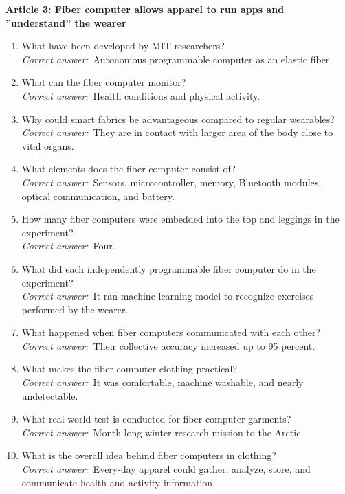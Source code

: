 \documentclass{IEEEtran}
\begin{document}
\textbf{Article 3: Fiber computer allows apparel to run apps and ''understand'' the wearer}

\begin{enumerate}
   \item What have been developed by MIT researchers?\\
   \textit{Correct answer:}~Autonomous programmable computer as an elastic fiber.

    \item What can the fiber computer monitor?\\
   \textit{Correct answer:}~Health conditions and physical activity.

    \item Why could smart fabrics be advantageous compared to regular wearables?\\
   \textit{Correct answer:}~They are in contact with larger area of the body close to vital organs.

    \item What elements does the fiber computer consist of?\\
   \textit{Correct answer:}~Sensors, microcontroller, memory, Bluetooth modules, optical communication, and battery.

    \item How many fiber computers were embedded into the top and leggings in the experiment?\\
   \textit{Correct answer:}~Four.

    \item What did each independently programmable fiber computer do in the experiment?\\
   \textit{Correct answer:}~It ran machine-learning model to recognize exercises performed by the wearer.

    \item What happened when fiber computers communicated with each other?\\
   \textit{Correct answer:}~Their collective accuracy increased up to 95 percent.

    \item  What makes the fiber computer clothing practical?\\
   \textit{Correct answer:}~It was comfortable, machine washable, and nearly undetectable.

    \item What real-world test is conducted for fiber computer garments?\\
   \textit{Correct answer:}~Month-long winter research mission to the Arctic.

    \item What is the overall idea behind fiber computers in clothing?\\
   \textit{Correct answer:}~Every-day apparel could gather, analyze, store, and communicate health and activity information.

\end{enumerate}


\balance


\end{document}
